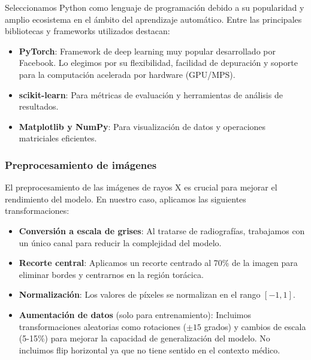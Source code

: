 \documentclass[es]{uc3mreport}
\begin{document}
\begin{report}
    Seleccionamos Python como lenguaje de programación debido a su popularidad y amplio ecosistema en el ámbito del aprendizaje automático. Entre las principales bibliotecas y frameworks utilizados destacan:
    
    \begin{itemize}
        \item \textbf{PyTorch}: Framework de deep learning muy popular desarrollado por Facebook. Lo elegimos por su flexibilidad, facilidad de depuración y soporte para la computación acelerada por hardware (GPU/MPS).
        \item \textbf{scikit-learn}: Para métricas de evaluación y herramientas de análisis de resultados.
        \item \textbf{Matplotlib y NumPy}: Para visualización de datos y operaciones matriciales eficientes.
    \end{itemize}
    
    \subsubsection{Preprocesamiento de imágenes}
    
    El preprocesamiento de las imágenes de rayos X es crucial para mejorar el rendimiento del modelo. En nuestro caso, aplicamos las siguientes transformaciones:
    
    \begin{itemize}
        \item \textbf{Conversión a escala de grises}: Al tratarse de radiografías, trabajamos con un único canal para reducir la complejidad del modelo.
        \item \textbf{Recorte central}: Aplicamos un recorte centrado al 70\% de la imagen para eliminar bordes y centrarnos en la región torácica.
        \item \textbf{Normalización}: Los valores de píxeles se normalizan en el rango $[-1, 1]$.
        \item \textbf{Aumentación de datos} (solo para entrenamiento): Incluimos transformaciones aleatorias como rotaciones ($\pm15$ grados) y cambios de escala (5-15\%) para mejorar la capacidad de generalización del modelo. No incluimos flip horizontal ya que no tiene sentido en el contexto médico.
    \end{itemize}


\end{report}
\end{document}
